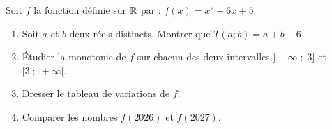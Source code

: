 \documentclass[10pt, a4paper]{article}
\begin{document}
\begin{Application}[][40 min]
Soit $f$ la fonction définie sur $\mathbb{R}$ par : $f(x) = x^2 - 6x + 5$
\begin{enumerate}[leftmargin=*,itemsep=0.5pt]
    \item Soit $a$ et $b$ deux réels distincts. Montrer que $T(a;b) = a+b-6$
    \item Étudier la monotonie de $f$ sur chacun des deux intervalles $\big]-\infty \;;\; 3\big]$ et $\big[3 \;;\; +\infty\big[$.
    \item Dresser le tableau de variations de $f$.
    \item Comparer les nombres $f(2026)$ et $f(2027)$.
\end{enumerate}
\end{Application}

\end{document}
